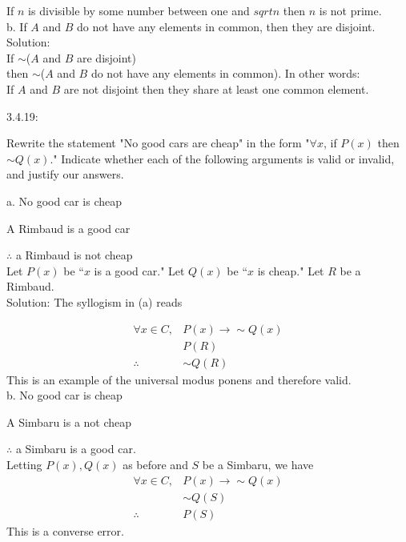 \documentclass[16 pt]{amsart}
\theoremstyle{definition}
\theoremstyle{remark}
\numberwithin{equation}{subsection}
\begin{document}
If $n$ is divisible by some number between one and $sqrt{n}$ then $n$ is not prime.\\





b. If $A$ and $B$ do not have any elements in common, then they are disjoint.\\


Solution: \\

If $\sim$($A$ and $B$ are disjoint)\\
 then $\sim$($A$ and $B$ do not have any elements in common).  In other words:\\

If $A$ and $B$ are not disjoint then they share at least one common element.

\newpage


3.4.19:

Rewrite the statement "No good cars are cheap" in the form
"$\forall x$, if $P(x)$ then $\sim Q(x)$." Indicate whether each of the following arguments is valid or invalid, and justify our answers.


a. No good car is cheap

A Rimbaud is a good car

$\therefore$ a Rimbaud is not cheap\\

Let $P(x)$ be ``$x$ is a good car." Let $Q(x)$ be ``$x$ is cheap." Let $R$ be a Rimbaud.\\

Solution: The syllogism in (a) reads


\begin{eqnarray*}
\forall x\in C, & P(x) \rightarrow \sim Q(x)\\
 & P(R)\\
\therefore &  \sim Q(R)
\end{eqnarray*}
This is an example of the universal modus ponens and therefore valid.\\


b. No good car is cheap

A Simbaru is a not cheap

$\therefore$ a Simbaru is a good car.\\

Letting $P(x),Q(x)$ as before and $S$ be a Simbaru, we have\\

\begin{eqnarray*}
\forall x\in C, & P(x) \rightarrow \sim Q(x)\\
& \sim Q(S)\\
\therefore & P(S)
\end{eqnarray*}
This is a converse error.\\
\end{document}
